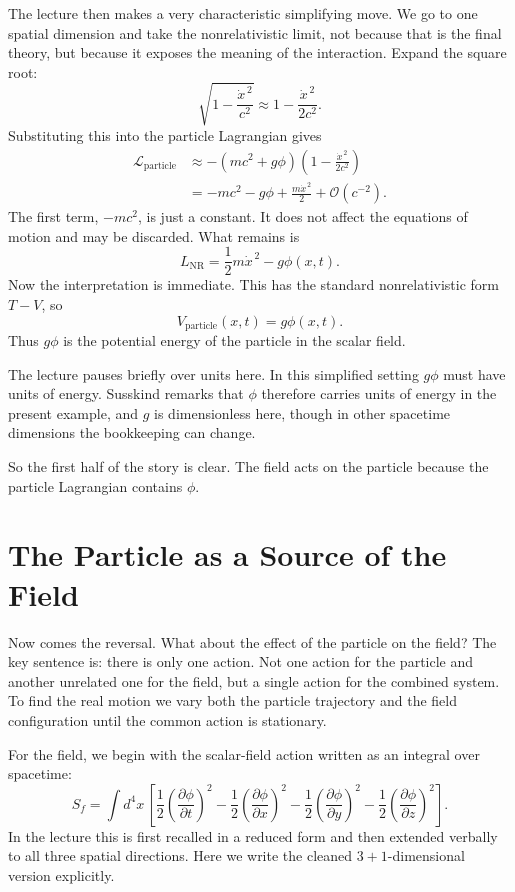 The lecture then makes a very characteristic simplifying move. We go to one spatial dimension and take the nonrelativistic limit, not because that is the final theory, but because it exposes the meaning of the interaction. Expand the square root:
\begin{equation}
\sqrt{1-\frac{\dot x^{\,2}}{c^2}}
\approx
1-\frac{\dot x^{\,2}}{2c^2}.
\end{equation}
Substituting this into the particle Lagrangian gives
\begin{align}
\mathcal L_{\mathrm{particle}}
&\approx
-(mc^2+g\phi)\left(1-\frac{\dot x^{\,2}}{2c^2}\right)\\
&=
-mc^2-g\phi+\frac{m\dot x^{\,2}}{2}
+\mathcal O(c^{-2}).
\end{align}
The first term, \(-mc^2\), is just a constant. It does not affect the equations of motion and may be discarded. What remains is
\begin{equation}
L_{\mathrm{NR}}=\frac12 m\dot x^{\,2}-g\phi(x,t).
\end{equation}
Now the interpretation is immediate. This has the standard nonrelativistic form \(T-V\), so
\begin{equation}
V_{\mathrm{particle}}(x,t)=g\phi(x,t).
\end{equation}
Thus \(g\phi\) is the potential energy of the particle in the scalar field.

The lecture pauses briefly over units here. In this simplified setting \(g\phi\) must have units of energy. Susskind remarks that \(\phi\) therefore carries units of energy in the present example, and \(g\) is dimensionless here, though in other spacetime dimensions the bookkeeping can change.

So the first half of the story is clear. The field acts on the particle because the particle Lagrangian contains \(\phi\).

\section{The Particle as a Source of the Field}

Now comes the reversal. What about the effect of the particle on the field? The key sentence is: there is only one action. Not one action for the particle and another unrelated one for the field, but a single action for the combined system. To find the real motion we vary both the particle trajectory and the field configuration until the common action is stationary.

For the field, we begin with the scalar-field action written as an integral over spacetime:
\begin{equation}
S_f
=
\int d^4x\,
\left[
\frac12\left(\frac{\partial\phi}{\partial t}\right)^2
-\frac12\left(\frac{\partial\phi}{\partial x}\right)^2
-\frac12\left(\frac{\partial\phi}{\partial y}\right)^2
-\frac12\left(\frac{\partial\phi}{\partial z}\right)^2
\right].
\end{equation}
In the lecture this is first recalled in a reduced form and then extended verbally to all three spatial directions. Here we write the cleaned \(3+1\)-dimensional version explicitly.

